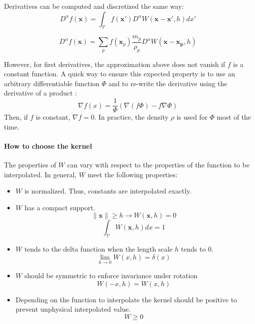 Derivatives can be computed and discretized the same way:
\begin{equation}
D^{\alpha} f(\mathbf{x}) = \int_{\mathcal{V}} f(\mathbf{x'}) D^{\alpha} W(\mathbf{x}-\mathbf{x'}, h)dx'
\end{equation}

\begin{equation}
\label{eq:sphDerivative}
D^{\alpha} f(\mathbf{x})= \sum_{p} f(\mathbf{x}_{p})\frac{m_{p}}{\rho_{p}} D^{\alpha} W(\mathbf{x}-\mathbf{x_{p}},h)
\end{equation}

However, for first derivatives, the approximation above does not vanish if $f$ is a constant function. 
A quick way to ensure this expected property is to use an arbitrary differentiable function $\Phi$ and to re-write the derivative using the derivative of a product :
\begin{equation}
\label{eq:hackSPH}
\nabla f(x) = \frac{1}{\Phi}\left(\nabla (f \Phi) - f \nabla \Phi \right)
\end{equation}
Then, if $f$ is constant, $\nabla f = 0$.
In practice, the density $\rho$ is used for $\Phi$ most of the time.

\paragraph{How to choose the kernel}
The properties of $W$ can vary with respect to the properties of the function to be interpolated. In general, $W$ meet the following properties:
\begin{itemize}
\item $W$ is normalized. Thus, constants are interpolated exactly.
\item $W$ has a compact support.
\begin{equation}
\parallel \mathbf{x} \parallel \geq h \rightarrow W(\mathbf{x},h) = 0 
\end{equation}
\begin{equation}
\int_{\mathcal{V}} W(\mathbf{x},h) dx = 1
\end{equation}
\item $W$ tends to the delta function when the length scale $h$ tends to $0$.
\begin{equation}
\lim_{h \rightarrow 0} W(x,h) = \delta(x)
\end{equation}
\item $W$ should be symmetric to enforce invariance under rotation
\begin{equation}
W(-x,h) = W(x,h)
\end{equation}
\item Depending on the function to interpolate the kernel should be positive to prevent unphysical interpolated value.
\begin{equation}
W \geq 0
\end{equation}
\end{itemize}

